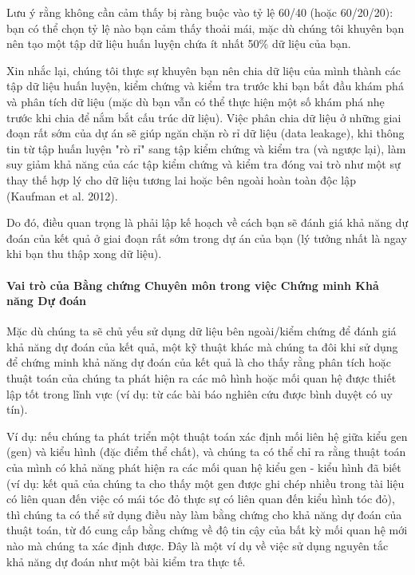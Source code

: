 Lưu ý rằng không cần cảm thấy bị ràng buộc vào tỷ lệ 60/40 (hoặc 60/20/20): bạn có thể chọn tỷ lệ nào bạn cảm thấy thoải mái, mặc dù chúng tôi khuyên bạn nên tạo một tập dữ liệu huấn luyện chứa ít nhất 50\% dữ liệu của bạn.

Xin nhắc lại, chúng tôi thực sự khuyên bạn nên chia dữ liệu của mình thành các tập dữ liệu huấn luyện, kiểm chứng và kiểm tra trước khi bạn bắt đầu khám phá và phân tích dữ liệu (mặc dù bạn vẫn có thể thực hiện một số khám phá nhẹ trước khi chia để nắm bắt cấu trúc dữ liệu). Việc phân chia dữ liệu ở những giai đoạn rất sớm của dự án sẽ giúp ngăn chặn rò rỉ dữ liệu (data leakage), khi thông tin từ tập huấn luyện "rò rỉ" sang tập kiểm chứng và kiểm tra (và ngược lại), làm suy giảm khả năng của các tập kiểm chứng và kiểm tra đóng vai trò như một sự thay thế hợp lý cho dữ liệu tương lai hoặc bên ngoài hoàn toàn độc lập (Kaufman et al. 2012).

Do đó, điều quan trọng là phải lập kế hoạch về cách bạn sẽ đánh giá khả năng dự đoán của kết quả ở giai đoạn rất sớm trong dự án của bạn (lý tưởng nhất là ngay khi bạn thu thập xong dữ liệu).

\paragraph{Vai trò của Bằng chứng Chuyên môn trong việc Chứng minh Khả năng Dự đoán}

Mặc dù chúng ta sẽ chủ yếu sử dụng dữ liệu bên ngoài/kiểm chứng để đánh giá khả năng dự đoán của kết quả, một kỹ thuật khác mà chúng ta đôi khi sử dụng để chứng minh khả năng dự đoán của kết quả là cho thấy rằng phân tích hoặc thuật toán của chúng ta phát hiện ra các mô hình hoặc mối quan hệ được thiết lập tốt trong lĩnh vực (ví dụ: từ các bài báo nghiên cứu được bình duyệt có uy tín).

Ví dụ: nếu chúng ta phát triển một thuật toán xác định mối liên hệ giữa kiểu gen (gen) và kiểu hình (đặc điểm thể chất), và chúng ta có thể chỉ ra rằng thuật toán của mình có khả năng phát hiện ra các mối quan hệ kiểu gen - kiểu hình đã biết (ví dụ: kết quả của chúng ta cho thấy một gen được ghi chép nhiều trong tài liệu có liên quan đến việc có mái tóc đỏ thực sự có liên quan đến kiểu hình tóc đỏ), thì chúng ta có thể sử dụng điều này làm bằng chứng cho khả năng dự đoán của thuật toán, từ đó cung cấp bằng chứng về độ tin cậy của bất kỳ mối quan hệ mới nào mà chúng ta xác định được. Đây là một ví dụ về việc sử dụng nguyên tắc khả năng dự đoán như một bài kiểm tra thực tế.

